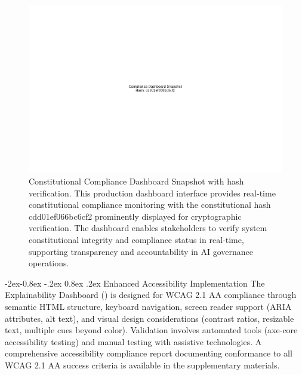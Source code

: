 \documentclass[manuscript,screen,9pt]{acmart}
\makeatletter
\renewcommand\subsubsection{\@startsection{subsubsection}{3}{\z@}%
  {-2ex\@plus -0.8ex \@minus -.2ex}%
  {0.8ex \@plus .2ex}%
  {\normalfont\normalsize\bfseries}}
\makeatother
\begin{document}
\FloatBarrier %
\begin{figure}[!htb]
	\centering
	\includegraphics[width=\linewidth,keepaspectratio]{figures/Figure_8_Compliance_Dashboard_Snapshot.png}
	\caption[Constitutional Compliance Dashboard Snapshot]{Constitutional Compliance Dashboard Snapshot with hash verification. This production dashboard interface provides real-time constitutional compliance monitoring with the constitutional hash cdd01ef066bc6cf2\cite{perf-report} prominently displayed for cryptographic verification. The dashboard enables stakeholders to verify system constitutional integrity and compliance status in real-time, supporting transparency and accountability in AI governance operations.}
	\label{fig:compliance_dashboard_snapshot}
\end{figure}

\subsubsection{Enhanced Accessibility Implementation}
\label{subsubsec:enhanced_accessibility}
The Explainability Dashboard () is designed for WCAG 2.1 AA compliance through semantic HTML structure, keyboard navigation, screen reader support (ARIA attributes, alt text), and visual design considerations (contrast ratios, resizable text, multiple cues beyond color). Validation involves automated tools (axe-core accessibility testing) and manual testing with assistive technologies. A comprehensive accessibility compliance report documenting conformance to all WCAG 2.1 AA success criteria is available in the supplementary materials.
\end{document}
